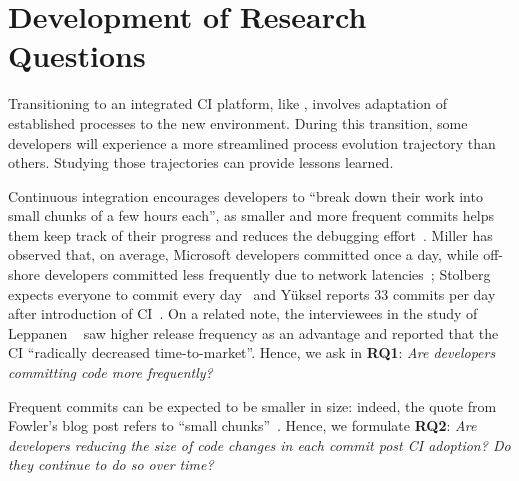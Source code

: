 
\section{Development of Research Questions}
\label{sec:background}

Transitioning to an integrated CI platform, like \Tvi, involves adaptation 
of established processes to the new environment. 
During this transition, some developers will experience a more streamlined 
process evolution trajectory than others. 
Studying those trajectories can provide lessons learned.


%


Continuous integration encourages developers to ``break down their work 
into small chunks of a few hours each'', as smaller and more frequent commits 
helps them keep track of their progress and reduces the debugging effort~\cite{Fowler,Duvall}. 
Miller has observed that, on average, Microsoft developers 
committed once a day, while off-shore developers committed less frequently 
due to network latencies~\cite{Miller}; Stolberg expects everyone to commit every 
day~\cite{Stolberg} and Y\"{u}ksel reports 33 commits per day after introduction 
of CI~\cite{Yuksel}. On a related note, the interviewees in the study of 
Leppanen \etal~\cite{Leppanen2015} saw higher release frequency as an
advantage and reported that the CI ``radically decreased time-to-market''. 
Hence, we ask in \textbf{RQ1}: 
\emph{Are developers committing code more frequently?}

Frequent commits can be expected to be smaller in size: indeed, 
 the quote from Fowler's blog post refers to ``small chunks''~\cite{Fowler,Duvall}.
Hence, we formulate \textbf{RQ2}: 
\emph{Are developers reducing the size of code changes in each commit 
post CI adoption? 
Do they continue to do so over time?}

